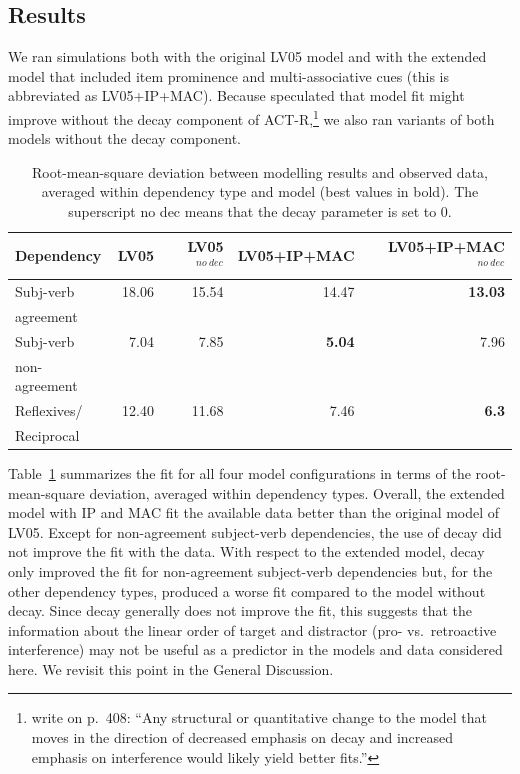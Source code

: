 \documentclass{cambridge7A}\usepackage[]{graphicx}\usepackage[]{color}
\begin{document}
\subsection{Results}
We ran simulations both with the original LV05 model and with the extended model that included item  prominence and  multi-associative cues (this is abbreviated as LV05+IP+MAC).
Because \cite{LewisVasishth2005} speculated that model fit might improve without the decay component of ACT-R,\footnote{
    \cite{LewisVasishth2005} write on p.\ 408: ``Any structural or quantitative change to the model that moves in the direction of decreased emphasis on decay and increased emphasis on interference would likely yield better fits.''}
we also ran variants of both models without the decay component.



\begin{table}[!htbp]
\centering
\begin{tabular}{lrrrr}
Dependency & LV05 & LV05$^{no\ dec}$ & LV05+IP+MAC & LV05+IP+MAC$^{no\ dec}$ \\ 
\hline
Subj-verb & 18.06 & 15.54 & 14.47 & \textbf{13.03} \\ 
agreement & & & & \\
  Subj-verb & 7.04 & 7.85 & \textbf{5.04} & 7.96 \\ 
non-agreement & & & & \\
  Reflexives/ & 12.40 & 11.68 & 7.46 & \textbf{6.3} \\ 
Reciprocal & & & & \\  
\hline
\end{tabular}
\caption{Root-mean-square deviation between modelling results and observed data, averaged within dependency type and model (best values in bold). The superscript no dec means that the decay parameter is set to 0.} \label{tab:simfit}
\end{table}

Table~\ref{tab:simfit} summarizes the fit for all four model configurations in terms of the root-mean-square deviation, averaged within dependency types.
Overall, the extended model with IP and MAC fit the available data better than the original model of LV05. 
Except for non-agreement subject-verb dependencies, the use of decay did not improve the fit with the data. 
With respect to the extended model, decay only improved the fit for non-agreement subject-verb dependencies but, for the other dependency types, produced a worse fit compared to the model without decay. 
Since decay generally does not improve the fit, this suggests that the information about the linear order of target and distractor (pro- vs.\ retroactive interference) may not be useful as a predictor in the models and data considered here. 
We revisit this point in the General Discussion.
\end{document}
